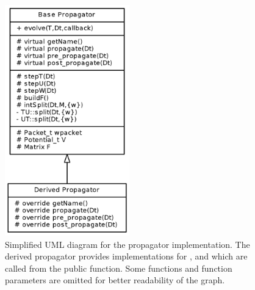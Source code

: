 \begin{figure}[h]
	\begin{center}
		\includegraphics[height=10cm]{figures/uml.png}
	\end{center}
	\label{fig:uml}
	\caption{Simplified UML diagram for the propagator implementation.
		The derived propagator provides implementations for ,  and  which are called from the public  function.
		Some functions and function parameters are omitted for better readability of the graph.}
\end{figure}



